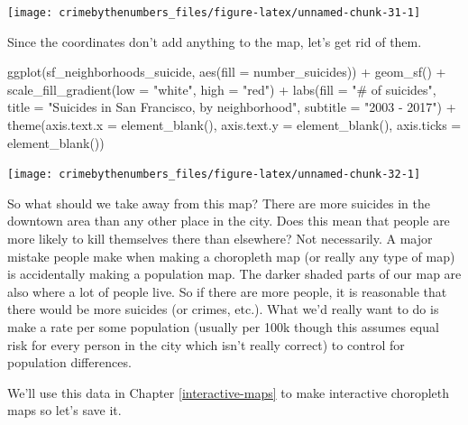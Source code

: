 \documentclass[
]{krantz}
\makeatletter
\newenvironment{Shaded}{\begin{snugshade}}{\end{snugshade}}
\newcommand{\AttributeTok}[1]{\textcolor[rgb]{0.61,0.61,0.61}{#1}}
\newcommand{\FunctionTok}[1]{\textcolor[rgb]{0,0,0}{#1}}
\newcommand{\NormalTok}[1]{#1}
\newcommand{\SpecialCharTok}[1]{\textcolor[rgb]{0,0,0}{#1}}
\newcommand{\StringTok}[1]{\textcolor[rgb]{0.5,0.5,0.5}{#1}}
\newenvironment{kframe}{%
\medskip{}
\setlength{\fboxsep}{.8em}
 \def\at@end@of@kframe{}%
 \ifinner\ifhmode%
  \def\at@end@of@kframe{\end{minipage}}%
  \begin{minipage}{\columnwidth}%
 \fi\fi%
 \def\FrameCommand##1{\hskip\@totalleftmargin \hskip-\fboxsep
 \colorbox{shadecolor}{##1}\hskip-\fboxsep
     \hskip-\linewidth \hskip-\@totalleftmargin \hskip\columnwidth}%
 \MakeFramed {\advance\hsize-\width
   \@totalleftmargin\z@ \linewidth\hsize
   \@setminipage}}%
 {\par\unskip\endMakeFramed%
 \at@end@of@kframe}
\renewenvironment{Shaded}{\begin{kframe}}{\end{kframe}}
\makeatother
\begin{document}
\begin{center}\texttt{[image: crimebythenumbers\_files/figure-latex/unnamed-chunk-31-1]} \end{center}

Since the coordinates don't add anything to the map, let's get rid of them.

\begin{Shaded}
\begin{Highlighting}[]
\FunctionTok{ggplot}\NormalTok{(sf\_neighborhoods\_suicide, }\FunctionTok{aes}\NormalTok{(}\AttributeTok{fill =}\NormalTok{ number\_suicides)) }\SpecialCharTok{+}
  \FunctionTok{geom\_sf}\NormalTok{() }\SpecialCharTok{+} \FunctionTok{scale\_fill\_gradient}\NormalTok{(}\AttributeTok{low =} \StringTok{"white"}\NormalTok{, }\AttributeTok{high =} \StringTok{"red"}\NormalTok{) }\SpecialCharTok{+}
  \FunctionTok{labs}\NormalTok{(}\AttributeTok{fill =} \StringTok{"\# of suicides"}\NormalTok{, }\AttributeTok{title =} \StringTok{"Suicides in San Francisco, by neighborhood"}\NormalTok{,}
    \AttributeTok{subtitle =} \StringTok{"2003 {-} 2017"}\NormalTok{) }\SpecialCharTok{+} \FunctionTok{theme}\NormalTok{(}\AttributeTok{axis.text.x =} \FunctionTok{element\_blank}\NormalTok{(),}
  \AttributeTok{axis.text.y =} \FunctionTok{element\_blank}\NormalTok{(), }\AttributeTok{axis.ticks =} \FunctionTok{element\_blank}\NormalTok{())}
\end{Highlighting}
\end{Shaded}

\begin{center}\texttt{[image: crimebythenumbers\_files/figure-latex/unnamed-chunk-32-1]} \end{center}

So what should we take away from this map? There are more suicides in the downtown area than any other place in the city. Does this mean that people are more likely to kill themselves there than elsewhere? Not necessarily. A major mistake people make when making a choropleth map (or really any type of map) is accidentally making a population map. The darker shaded parts of our map are also where a lot of people live. So if there are more people, it is reasonable that there would be more suicides (or crimes, etc.). What we'd really want to do is make a rate per some population (usually per 100k though this assumes equal risk for every person in the city which isn't really correct) to control for population differences.

We'll use this data in Chapter \ref{interactive-maps} to make interactive choropleth maps so let's save it.
\end{document}
